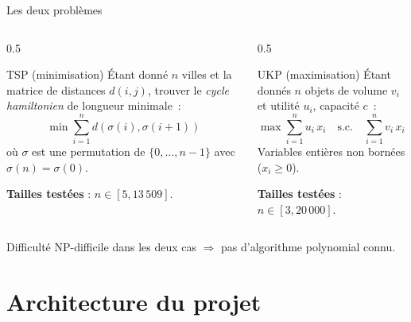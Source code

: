 \documentclass[aspectratio=169, 11pt]{beamer}
\begin{document}
\begin{frame}{Les deux problèmes}
\begin{columns}[T]
\begin{column}{0.5\textwidth}
\begin{block}{TSP (minimisation)}
Étant donné $n$ villes et la matrice de distances $d(i,j)$, trouver le \emph{cycle hamiltonien} de longueur minimale~:
\[
  \min \sum_{i=1}^{n} d(\sigma(i), \sigma(i\!+\!1))
\]
où $\sigma$ est une permutation de $\{0,\ldots,n-1\}$ avec $\sigma(n) = \sigma(0)$.
\end{block}
\textbf{Tailles testées} : $n \in [5, 13\,509]$.
\end{column}
\begin{column}{0.5\textwidth}
\begin{block}{UKP (maximisation)}
Étant donnés $n$ objets de volume $v_i$ et utilité $u_i$, capacité $c$~:
\[
  \max \sum_{i=1}^{n} u_i \, x_i \quad \text{s.c.} \quad \sum_{i=1}^{n} v_i \, x_i \leq c, \; x_i \in \mathbb{N}
\]
Variables \alert{entières non bornées} ($x_i \geq 0$).
\end{block}
\textbf{Tailles testées} : $n \in [3, 20\,000]$.
\end{column}
\end{columns}

\vspace{0.4em}
\begin{alertblock}{Difficulté}
NP-difficile dans les deux cas $\Rightarrow$ pas d'algorithme polynomial connu.
\end{alertblock}
\end{frame}

\section{Architecture du projet}
\end{document}

